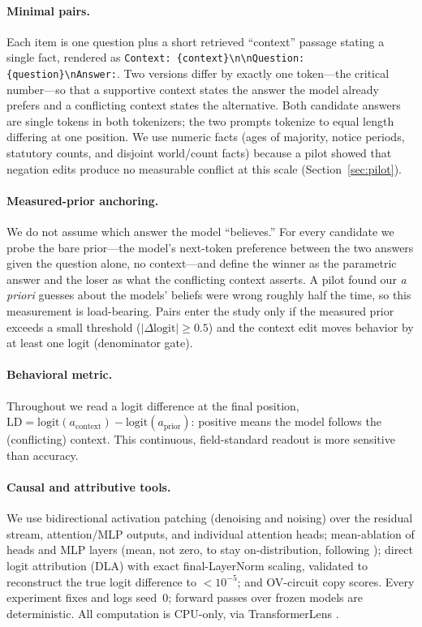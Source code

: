 \documentclass[11pt]{article}
\begin{document}
\paragraph{Minimal pairs.} Each item is one question plus a short retrieved
``context'' passage stating a single fact, rendered as
\texttt{Context: \{context\}\textbackslash n\textbackslash nQuestion:
\{question\}\textbackslash nAnswer:}. Two versions differ by exactly one
token---the critical number---so that a supportive context states the answer
the model already prefers and a conflicting context states the alternative.
Both candidate answers are single tokens in both tokenizers; the two prompts
tokenize to equal length differing at one position. We use numeric facts
(ages of majority, notice periods, statutory counts, and disjoint world/count
facts) because a pilot showed that negation edits produce no measurable
conflict at this scale (Section~\ref{sec:pilot}).

\paragraph{Measured-prior anchoring.} We do not assume which answer the model
``believes.'' For every candidate we probe the bare prior---the model's
next-token preference between the two answers given the question alone, no
context---and define the winner as the parametric answer and the loser as what
the conflicting context asserts. A pilot found our \emph{a priori} guesses
about the models' beliefs were wrong roughly half the time, so this
measurement is load-bearing. Pairs enter the study only if the measured prior
exceeds a small threshold ($|\Delta\text{logit}|\ge 0.5$) and the context edit
moves behavior by at least one logit (denominator gate).

\paragraph{Behavioral metric.} Throughout we read a logit difference at the
final position, $\mathrm{LD} = \text{logit}(a_\text{context}) -
\text{logit}(a_\text{prior})$: positive means the model follows the
(conflicting) context. This continuous, field-standard readout is more
sensitive than accuracy.

\paragraph{Causal and attributive tools.} We use bidirectional activation
patching (denoising and noising) over the residual stream, attention/MLP
outputs, and individual attention heads; mean-ablation of heads and MLP layers
(mean, not zero, to stay on-distribution, following
\citealp{heimersheim2024patching}); direct logit attribution (DLA) with exact
final-LayerNorm scaling, validated to reconstruct the true logit difference to
$<10^{-5}$; and OV-circuit copy scores. Every experiment fixes and logs
seed~0; forward passes over frozen models are deterministic. All computation
is CPU-only, via TransformerLens \citep{nanda2022tl}.
\end{document}
